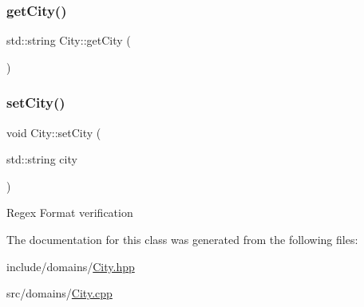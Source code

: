 \subsubsection{\texorpdfstring{getCity()}{getCity()}}
{\footnotesize\ttfamily std\+::string City\+::get\+City (\begin{DoxyParamCaption}{ }\end{DoxyParamCaption})}

\mbox{\label{class_city_a9f2a2f59076c2ec2591d3713e8ee29c5}} 
\subsubsection{\texorpdfstring{setCity()}{setCity()}}
{\footnotesize\ttfamily void City\+::set\+City (\begin{DoxyParamCaption}\item[{std\+::string}]{city }\end{DoxyParamCaption})}

Regex Format verification 

The documentation for this class was generated from the following files\+:\begin{DoxyCompactItemize}
\item 
include/domains/\mbox{\hyperlink{_city_8hpp}{City.\+hpp}}\item 
src/domains/\mbox{\hyperlink{_city_8cpp}{City.\+cpp}}\end{DoxyCompactItemize}
